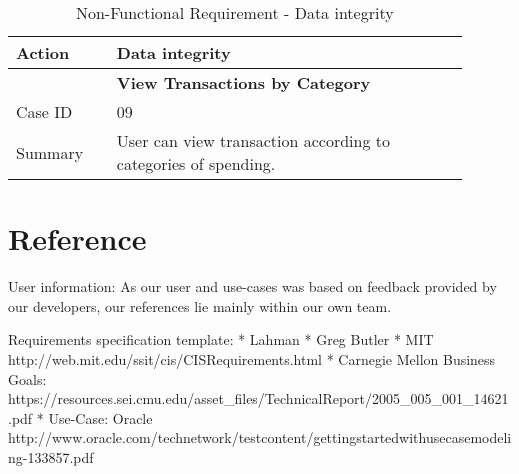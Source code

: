\documentclass[11pt]{article}
\newcounter{use case ID}
\newcommand\tabularhead[1]{
\begin{table}[ht]
    \addtocounter{use case ID}{1}
    \caption{Use Case \arabic{use case ID} - #1}
    \vspace{0.2cm}
    \begin{tabular}{|p{0.2\linewidth}|p{0.70\linewidth}|}
    \hline
        \textbf{Action} & \textbf{#1} \\
        \hline}
\newcommand\addrow[2]{#1 & #2\\ \hline}
\newcommand\addmulrow[2]{ \begin{minipage}[t][][t]{2.5cm}#1\end{minipage}
        &\begin{minipage}[t][][t]{11cm}
        \begin{enumerate}[itemsep=-1ex] #2   \end{enumerate}
    \end{minipage}\vfill\\ \hline}
\newenvironment{usecase}{\tabularhead}
{\hline\end{tabular}\end{table}}
\newcounter{req ID}
\newcommand\tabularheadfsd[1]{
\begin{table}[ht]
    \addtocounter{req ID}{1}
    \caption{Non-Functional Requirement \arabic{req ID} - #1}
    \vspace{0.2cm}
    \begin{tabular}{|p{0.2\linewidth}|p{0.70\linewidth}|}
    \hline
        \textbf{Action} & \textbf{#1} \\
        \hline}
\newenvironment{requirement}{\tabularheadfsd}
{\hline\end{tabular}\end{table}}
\begin{document}
\begin{requirement}{Data integrity}
\begin{usecase}{View Transactions by Category}
    \addrow{Case ID}{09}
    \addrow{Summary}{User can view transaction according to categories of spending.}
\end{usecase}

\section{Reference}
User information: As our user and use-cases was based on feedback provided by our developers, our references lie mainly within our own team.

Requirements specification template:
* Lahman
* Greg Butler
* MIT http://web.mit.edu/ssit/cis/CISRequirements.html
* Carnegie Mellon Business Goals: https://resources.sei.cmu.edu/asset_files/TechnicalReport/2005_005_001_14621.pdf
* Use-Case: Oracle http://www.oracle.com/technetwork/testcontent/gettingstartedwithusecasemodeling-133857.pdf
\end{document}
